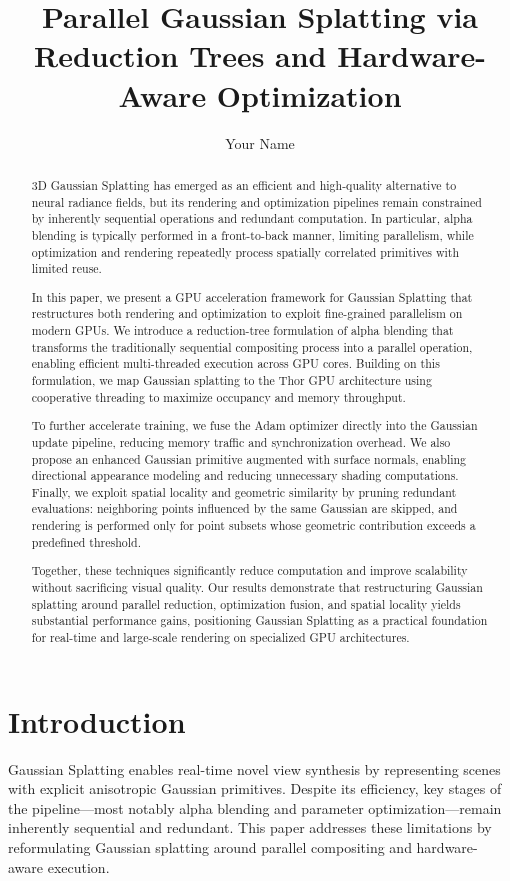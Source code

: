\documentclass[10pt,twocolumn]{article}
\title{\vspace{-1.2em}\Large\bfseries Parallel Gaussian Splatting via Reduction Trees and Hardware-Aware Optimization \vspace{-0.5em}}
\author{\normalsize Your Name}
\date{}
\begin{document}
\maketitle

\begin{abstract}
3D Gaussian Splatting has emerged as an efficient and high-quality alternative to neural radiance fields, but its rendering and optimization pipelines remain constrained by inherently sequential operations and redundant computation. In particular, alpha blending is typically performed in a front-to-back manner, limiting parallelism, while optimization and rendering repeatedly process spatially correlated primitives with limited reuse.

In this paper, we present a GPU acceleration framework for Gaussian Splatting that restructures both rendering and optimization to exploit fine-grained parallelism on modern GPUs. We introduce a reduction-tree formulation of alpha blending that transforms the traditionally sequential compositing process into a parallel operation, enabling efficient multi-threaded execution across GPU cores. Building on this formulation, we map Gaussian splatting to the Thor GPU architecture using cooperative threading to maximize occupancy and memory throughput.

To further accelerate training, we fuse the Adam optimizer directly into the Gaussian update pipeline, reducing memory traffic and synchronization overhead. We also propose an enhanced Gaussian primitive augmented with surface normals, enabling directional appearance modeling and reducing unnecessary shading computations. Finally, we exploit spatial locality and geometric similarity by pruning redundant evaluations: neighboring points influenced by the same Gaussian are skipped, and rendering is performed only for point subsets whose geometric contribution exceeds a predefined threshold.

Together, these techniques significantly reduce computation and improve scalability without sacrificing visual quality. Our results demonstrate that restructuring Gaussian splatting around parallel reduction, optimization fusion, and spatial locality yields substantial performance gains, positioning Gaussian Splatting as a practical foundation for real-time and large-scale rendering on specialized GPU architectures.
\end{abstract}

\section{Introduction}
Gaussian Splatting enables real-time novel view synthesis by representing scenes with explicit anisotropic Gaussian primitives. Despite its efficiency, key stages of the pipeline—most notably alpha blending and parameter optimization—remain inherently sequential and redundant. This paper addresses these limitations by reformulating Gaussian splatting around parallel compositing and hardware-aware execution.
\end{document}
